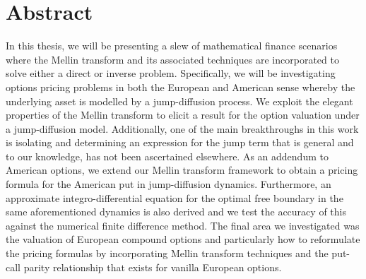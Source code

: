 \chapter*{Abstract} %

In this thesis, we will be presenting a slew of mathematical finance scenarios where the Mellin transform and its associated techniques are incorporated to solve either a direct or inverse problem. Specifically, we will be investigating options pricing problems in both the European and American sense whereby the underlying asset is modelled by a jump-diffusion process. We exploit the elegant properties of the Mellin transform to elicit a result for the option valuation under a jump-diffusion model. Additionally, one of the main breakthroughs in this work is isolating and determining an expression for the jump term that is general and to our knowledge, has not been ascertained elsewhere. As an addendum to American options, we extend our Mellin transform framework to obtain a pricing formula for the American put in jump-diffusion dynamics. Furthermore, an approximate integro-differential equation for the optimal free boundary in the same aforementioned dynamics is also derived and we test the accuracy of this against the numerical finite difference method. The final area we investigated was the valuation of European compound options and particularly how to reformulate the pricing formulas by incorporating Mellin transform techniques and the put-call parity relationship that exists for vanilla European options.
